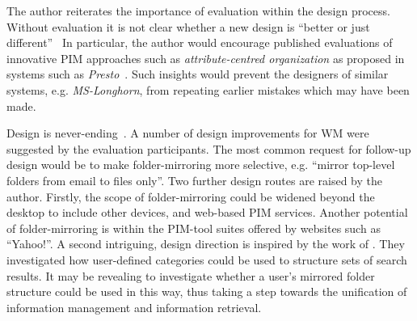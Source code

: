 The author reiterates the importance of evaluation within the design process.  Without evaluation it is not clear whether a new design is ``better or just different''~\citep{newman:95}   In particular, the author would encourage published evaluations of innovative PIM approaches such as \textit{attribute-centred organization} as proposed in systems such as \textit{Presto}~\citep{dourish:99a}.  Such insights would prevent the designers of similar systems, e.g. \textit{MS-Longhorn}, from repeating earlier mistakes which may have been made.


Design is never-ending~\citep{Carroll:00}. A number of design improvements for WM were suggested by the evaluation participants. The most common request for follow-up design would be to make folder-mirroring more selective, e.g. ``mirror top-level folders from email to files only''.
Two further design routes are raised by the author.  Firstly, the scope of folder-mirroring could be widened beyond the desktop to include other devices, and web-based PIM services.  Another potential of folder-mirroring is within the PIM-tool suites offered by websites such as ``Yahoo!''. %
A second intriguing, design direction is inspired by the work of \citet{Chaffee:00}.  They investigated how user-defined categories could be used to structure sets of search results.  It may be revealing to investigate whether a user's mirrored folder structure could be used in this way, thus taking a step towards the unification of information management and information retrieval. %


